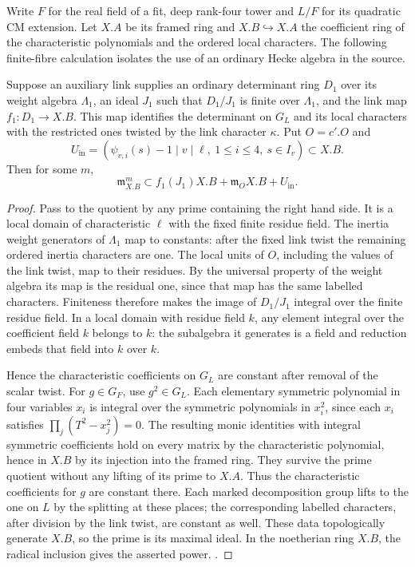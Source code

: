 Write \(F\) for the real field of a fit, deep rank-four tower and
\(L/F\) for its quadratic CM extension. Let \(X.A\) be its framed
ring and \(X.B\hookrightarrow X.A\) the coefficient ring of the
characteristic polynomials and the ordered local characters. The
following finite-fibre calculation isolates the use of an ordinary
Hecke algebra in the source.

\begin{lemma}\label{hr:towerfin}
Suppose an auxiliary link supplies an ordinary determinant ring
\(D_1\) over its weight algebra \(\Lambda_1\), an ideal \(J_1\)
such that \(D_1/J_1\) is finite over \(\Lambda_1\), and the link
map \(f_1:D_1\to X.B\). This map identifies the determinant on
\(G_L\) and its local characters with the restricted ones twisted
by the link character \(\kappa\). Put \(O=c'.O\) and
\[
 U_{\mathrm{in}}=(\psi_{v,i}(s)-1\mid v\mid\ell,\ 
                   1\le i\le4,\ s\in I_v)\subset X.B .
\]
Then for some \(m\),
\[
 \mathfrak m_{X.B}^{m}
       \subset f_1(J_1)X.B+\mathfrak m_O X.B+U_{\mathrm{in}}.
\]
\end{lemma}
\begin{proof}
Pass to the quotient by any prime containing the right hand side.
It is a local domain of characteristic \(\ell\) with the fixed
finite residue field. The inertia weight generators of \(\Lambda_1\)
map to constants: after the fixed link twist the remaining ordered
inertia characters are one. The local units of \(O\), including
the values of the link twist, map to their residues. By the
universal property of the weight algebra its map is the residual
one, since that map has the same labelled characters. Finiteness
therefore makes the image of \(D_1/J_1\) integral over the finite
residue field. In a local domain with residue field \(k\), any
element integral over the coefficient field \(k\) belongs to \(k\):
the subalgebra it generates is a field and reduction embeds that
field into \(k\) over \(k\).

Hence the characteristic coefficients on \(G_L\) are constant
after removal of the scalar twist. For \(g\in G_F\), use
\(g^2\in G_L\). Each elementary symmetric polynomial in four
variables \(x_i\) is integral over the symmetric polynomials in
\(x_i^2\), since each \(x_i\) satisfies
\(\prod_j(T^2-x_j^2)=0\). The resulting monic identities with
integral symmetric coefficients hold on every matrix by the
characteristic polynomial, hence in \(X.B\) by its injection
into the framed ring. They survive the prime quotient without
any lifting of its prime to \(X.A\). Thus the characteristic
coefficients for \(g\) are constant there. Each marked decomposition
group lifts to the one on \(L\) by the splitting at these places;
the corresponding labelled characters, after division by the link
twist, are constant as well. These data topologically generate
\(X.B\), so the prime is its maximal ideal. In the noetherian ring
\(X.B\), the radical inclusion gives the asserted power.
.
\end{proof}


